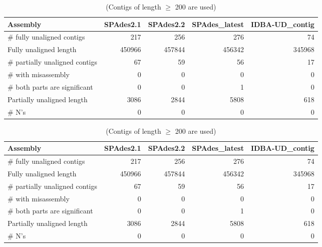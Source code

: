 \begin{table}[ht]
\begin{center}
\caption{(Contigs of length $\geq$ 200 are used)}
\begin{tabular}{|l*{4}{|r}|}
\hline
Assembly & SPAdes2.1 & SPAdes2.2 & SPAdes\_latest & IDBA-UD\_contig \\ \hline
\# fully unaligned contigs & 217 & 256 & 276 & 74 \\ \hline
Fully unaligned length & 450966 & 457844 & 456342 & 345968 \\ \hline
\# partially unaligned contigs & 67 & 59 & 56 & 17 \\ \hline
    \# with misassembly & 0 & 0 & 0 & 0 \\ \hline
    \# both parts are significant & 0 & 0 & 1 & 0 \\ \hline
Partially unaligned length & 3086 & 2844 & 5808 & 618 \\ \hline
\# N's & 0 & 0 & 0 & 0 \\ \hline
\end{tabular}
\end{center}
\end{table}
\begin{table}[ht]
\begin{center}
\caption{(Contigs of length $\geq$ 200 are used)}
\begin{tabular}{|l*{4}{|r}|}
\hline
Assembly & SPAdes2.1 & SPAdes2.2 & SPAdes\_latest & IDBA-UD\_contig \\ \hline
\# fully unaligned contigs & 217 & 256 & 276 & 74 \\ \hline
Fully unaligned length & 450966 & 457844 & 456342 & 345968 \\ \hline
\# partially unaligned contigs & 67 & 59 & 56 & 17 \\ \hline
    \# with misassembly & 0 & 0 & 0 & 0 \\ \hline
    \# both parts are significant & 0 & 0 & 1 & 0 \\ \hline
Partially unaligned length & 3086 & 2844 & 5808 & 618 \\ \hline
\# N's & 0 & 0 & 0 & 0 \\ \hline
\end{tabular}
\end{center}
\end{table}

